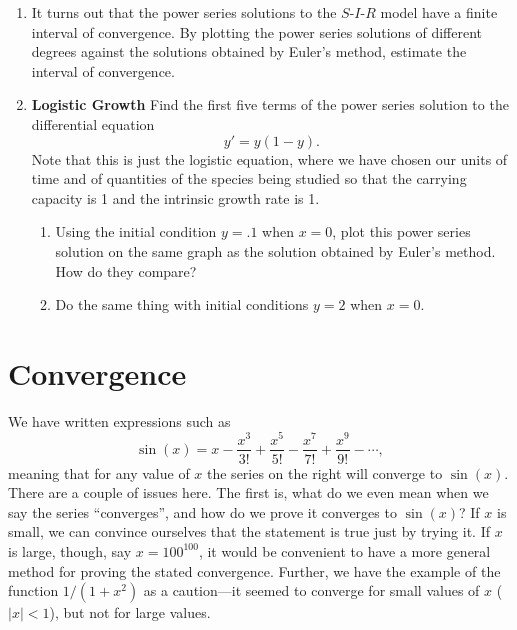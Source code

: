 \begin{enumerate}
\begin{enumerate}
\end{enumerate}
\item It turns out that the power series solutions to the $S$-$I$-$R$
model have a finite interval of convergence.  By plotting the power
series solutions of different degrees against the solutions obtained
by Euler's method, estimate the interval of convergence.


\item {\bf Logistic Growth} Find the first five
terms of the power series solution to the differential equation
\[
y'=y(1-y).
\]
Note that this is just the logistic equation, where we have chosen our
units of time and of quantities of the species being studied so that
the carrying capacity is 1 and the intrinsic growth rate is 1.

  \begin{enumerate}
  \item Using the initial condition $y=.1$ when $x=0$, plot this power
series solution on the same graph as the solution obtained by Euler's
method.  How do they compare?

  \item Do the same thing with initial conditions $y=2$ when $x=0$.




\end{enumerate}
\end{enumerate}
\section{Convergence}
\label{sec:convergence}

We have written expressions such as
\[
\sin(x) = x - \dfrac{x^3}{3!} + \dfrac{x^5}{5!} 
                - \dfrac{x^7}{7!} + \dfrac{x^9}{9!} - \cdots ,
\] 
meaning that for any value of $x$ the series on the right will
converge to $\sin(x)$.  There are a couple of issues here.  The first
is, what do we even mean when we say the series ``converges'', and how
do we prove it converges to $\sin(x)$?  If $x$ is small, we can
convince ourselves that the statement is true just by trying it.  If
$x$ is large, though, say $x=100^{100}$, it would be convenient to
have a more general method for proving the stated convergence.
Further, we have the example of the function $1/(1+x^2)$ as a
caution---it seemed to converge for small values of $x$ ($|x|<1$), but
not for large values.

